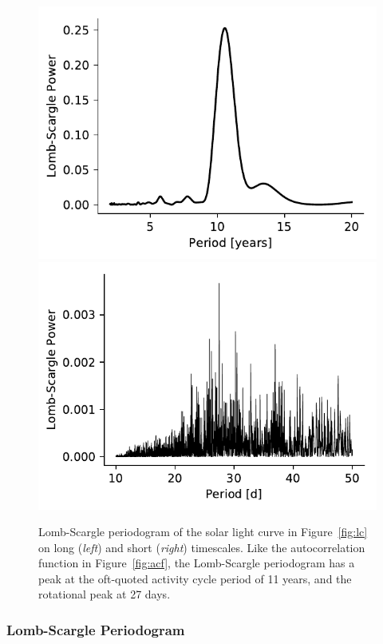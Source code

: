 \begin{figure}
    \centering
    \includegraphics[scale=0.8]{howard/ls_long.pdf}
    \includegraphics[scale=0.8]{howard/ls.pdf}
    \caption{Lomb-Scargle periodogram of the solar light curve in Figure~\ref{fig:lc} on long ({\it left}) and short ({\it right}) timescales. Like the autocorrelation function in Figure~\ref{fig:acf}, the Lomb-Scargle periodogram has a peak at the oft-quoted activity cycle period of 11 years, and the rotational peak at 27 days.}
    \label{fig:ls}
\end{figure}

\subsubsection{Lomb-Scargle Periodogram}

